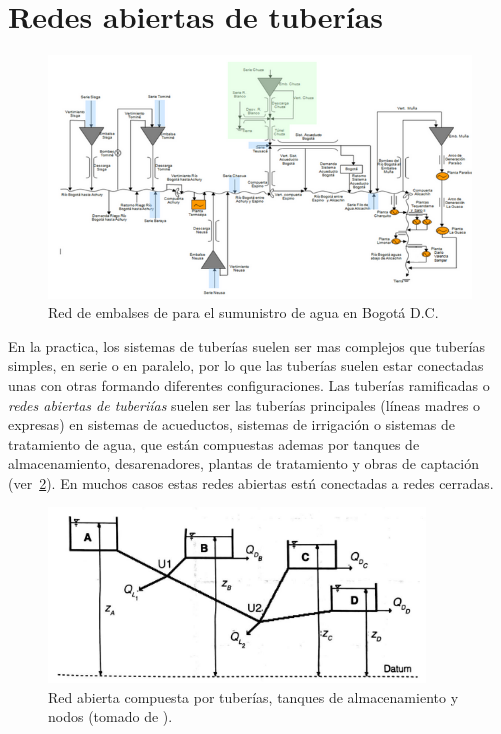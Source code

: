 \documentclass[11pt, oneside]{article}
\begin{document}
\section{Redes abiertas de tuber\'ias} 
\begin{figure}[h]
\centering
\includegraphics[width=\textwidth]{./figs/opn0.png}
\caption{Red de embalses de para el sumunistro de agua en Bogot\'a D.C.} 
\label{opn0}
\end{figure}


En la practica, los sistemas de tuber\'ias suelen ser mas complejos que tuber\'ias simples, en serie o en paralelo, por lo que las tuber\'ias suelen estar conectadas unas con otras formando diferentes configuraciones. Las tuber\'ias ramificadas o \emph{redes abiertas de tuberi\'ias} suelen ser las tuber\'ias principales (l\'ineas madres o expresas) en sistemas de acueductos, sistemas de irrigaci\'on o sistemas de tratamiento de agua, que est\'an compuestas ademas por tanques de almacenamiento, desarenadores, plantas de tratamiento y obras de captaci\'on (ver~\ref{opn1}). En muchos casos estas redes abiertas est\'n conectadas a redes cerradas. 

\begin{figure}[h]
\centering
\includegraphics[width=10cm]{./figs/opn1.jpeg}
\caption{Red abierta compuesta por tuber\'ias, tanques de almacenamiento y nodos (tomado de \cite{saldarriaga}).} 
\label{opn1}
\end{figure}
\end{document}
